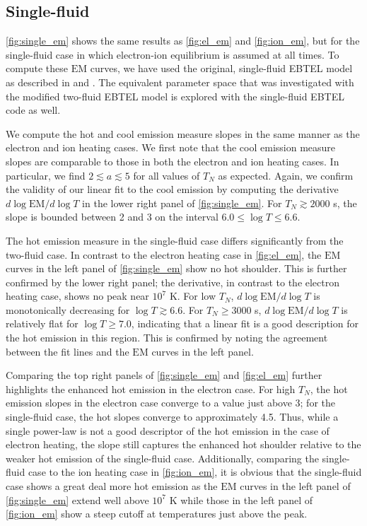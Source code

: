 \documentclass[apj]{emulateapj}
\begin{document}
	\subsection{Single-fluid}
	\label{subsec:single_heating}
	\par \autoref{fig:single_em} shows the same results as \autoref{fig:el_em} and \autoref{fig:ion_em}, but for the single-fluid case in which electron-ion equilibrium is assumed at all times. To compute these $\mathrm{EM}$ curves, we have used the original, single-fluid EBTEL model as described in \citet{klimchuk_highly_2008} and \citet{cargill_enthalpy-based_2012}. The equivalent parameter space that was investigated with the modified two-fluid EBTEL model is explored with the single-fluid EBTEL code as well.
	\par We compute the hot and cool emission measure slopes in the same manner as the electron and ion heating cases. We first note that the cool emission measure slopes are comparable to those in both the electron and ion heating cases. In particular, we find $2\lesssim a\lesssim5$ for all values of $T_N$ as expected. Again, we confirm the validity of our linear fit to the cool emission by computing the derivative $d\log{\mathrm{EM}}/d\log{T}$ in the lower right panel of \autoref{fig:single_em}. For $T_N\gtrsim2000$ s, the slope is bounded between 2 and 3 on the interval $6.0\le\log{T}\le6.6$. 
	\par The hot emission measure in the single-fluid case differs significantly from the two-fluid case. In contrast to the electron heating case in \autoref{fig:el_em}, the $\mathrm{EM}$ curves in the left panel of \autoref{fig:single_em} show no hot shoulder. This is further confirmed by the lower right panel; the derivative, in contrast to the electron heating case, shows no peak near $10^7$ K. For low $T_N$, $d\log{\mathrm{EM}}/d\log{T}$ is monotonically decreasing for $\log{T}\gtrsim6.6$. For $T_N\ge3000$ s, $d\log{\mathrm{EM}}/d\log{T}$ is relatively flat for $\log{T}\ge7.0$, indicating that a linear fit is a good description for the hot emission in this region. This is confirmed by noting the agreement between the fit lines and the $\mathrm{EM}$ curves in the left panel.
	\par Comparing the top right panels of \autoref{fig:single_em} and \autoref{fig:el_em} further highlights the enhanced hot emission in the electron case. For high $T_N$, the hot emission slopes in the electron case converge to a value just above 3; for the single-fluid case, the hot slopes converge to approximately 4.5. Thus, while a single power-law is not a good descriptor of the hot emission in the case of electron heating, the slope still captures the enhanced hot shoulder relative to the weaker hot emission of the single-fluid case. Additionally, comparing the single-fluid case to the ion heating case in \autoref{fig:ion_em}, it is obvious that the single-fluid case shows a great deal more hot emission as the $\mathrm{EM}$ curves in the left panel of \autoref{fig:single_em} extend well above $10^7$ K while those in the left panel of \autoref{fig:ion_em} show a steep cutoff at temperatures just above the peak.
\end{document}

